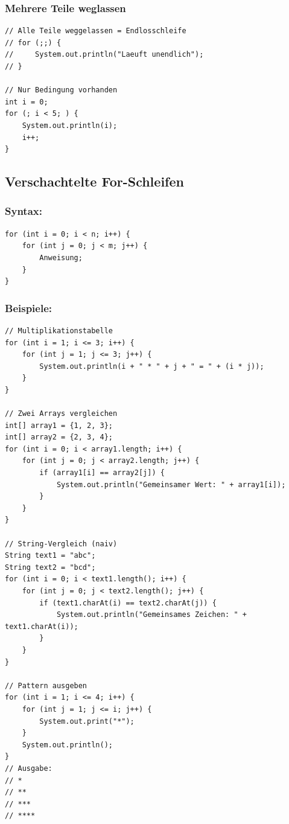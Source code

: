 \subsubsection*{Mehrere Teile weglassen}

\begin{lstlisting}
// Alle Teile weggelassen = Endlosschleife
// for (;;) {
//     System.out.println("Laeuft unendlich");
// }

// Nur Bedingung vorhanden
int i = 0;
for (; i < 5; ) {
    System.out.println(i);
    i++;
}
\end{lstlisting}

\newpage


\subsection*{Verschachtelte For-Schleifen}

\subsubsection*{Syntax:}
\begin{lstlisting}
for (int i = 0; i < n; i++) {
    for (int j = 0; j < m; j++) {
        Anweisung;
    }
}
\end{lstlisting}

\subsubsection*{Beispiele:}
\begin{lstlisting}
// Multiplikationstabelle
for (int i = 1; i <= 3; i++) {
    for (int j = 1; j <= 3; j++) {
        System.out.println(i + " * " + j + " = " + (i * j));
    }
}

// Zwei Arrays vergleichen
int[] array1 = {1, 2, 3};
int[] array2 = {2, 3, 4};
for (int i = 0; i < array1.length; i++) {
    for (int j = 0; j < array2.length; j++) {
        if (array1[i] == array2[j]) {
            System.out.println("Gemeinsamer Wert: " + array1[i]);
        }
    }
}

// String-Vergleich (naiv)
String text1 = "abc";
String text2 = "bcd";
for (int i = 0; i < text1.length(); i++) {
    for (int j = 0; j < text2.length(); j++) {
        if (text1.charAt(i) == text2.charAt(j)) {
            System.out.println("Gemeinsames Zeichen: " + text1.charAt(i));
        }
    }
}

// Pattern ausgeben
for (int i = 1; i <= 4; i++) {
    for (int j = 1; j <= i; j++) {
        System.out.print("*");
    }
    System.out.println();
}
// Ausgabe:
// *
// **
// ***
// ****
\end{lstlisting}

